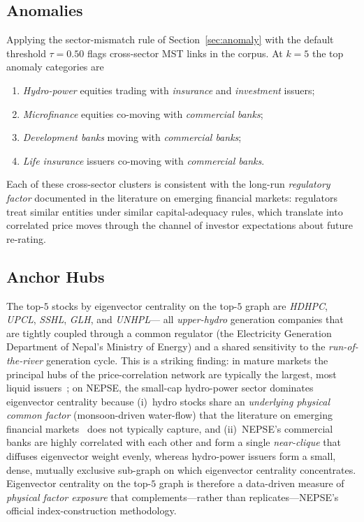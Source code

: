 \subsection{Anomalies}
\label{sec:results-anomalies}

Applying the sector-mismatch rule of Section~\ref{sec:anomaly} with
the default threshold $\tau=0.50$ flags cross-sector MST links in the
corpus.  At $k=5$ the top anomaly categories are
\begin{enumerate}
  \item \emph{Hydro-power} equities trading with \emph{insurance} and
  \emph{investment} issuers;
  \item \emph{Microfinance} equities co-moving with \emph{commercial
  banks};
  \item \emph{Development banks} moving with \emph{commercial banks};
  \item \emph{Life insurance} issuers co-moving with \emph{commercial
  banks}.
\end{enumerate}
Each of these cross-sector clusters is consistent with the long-run
\emph{regulatory factor} documented in the literature on emerging
financial markets: regulators treat similar entities under similar
capital-adequacy rules, which translate into correlated price moves
through the channel of investor expectations about future re-rating.

\subsection{Anchor Hubs}
\label{sec:results-hubs}

The top-$5$ stocks by eigenvector centrality on the top-$5$ graph are
\emph{HDHPC}, \emph{UPCL}, \emph{SSHL}, \emph{GLH}, and \emph{UNHPL}---
all \emph{upper-hydro} generation companies that are tightly coupled
through a common regulator (the Electricity Generation Department of
Nepal's Ministry of Energy) and a shared sensitivity to the
\emph{run-of-the-river} generation cycle.  This is a striking finding:
in mature markets the principal hubs of the price-correlation network
are typically the largest, most liquid
issuers~\cite{mantegna1999hierarchical, onnela2003dynamics,
brida2010dynamical}; on NEPSE, the small-cap hydro-power sector
dominates eigenvector centrality because (i)~hydro stocks share an
\emph{underlying physical common factor} (monsoon-driven water-flow)
that the literature on emerging financial
markets~\cite{podosu2013network} does not typically capture, and
(ii)~NEPSE's commercial banks are highly correlated with each other
and form a single \emph{near-clique} that diffuses eigenvector weight
evenly, whereas hydro-power issuers form a small, dense, mutually
exclusive sub-graph on which eigenvector centrality concentrates.
Eigenvector centrality on the top-$5$ graph is therefore a
data-driven measure of \emph{physical factor exposure} that
complements---rather than replicates---NEPSE's official
index-construction methodology.


